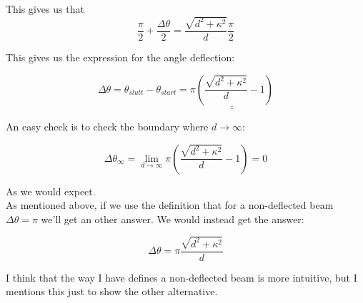 \documentclass[a4paper,norsk, 10pt]{article}
\begin{document}
This gives us that 
$$
\frac{\pi}{2} + \frac{\Delta \theta}{2} = \frac{\sqrt{d^2 +\kappa^2}}{d} \frac{\pi}{2}
$$


This gives us the expression for the angle deflection:

$$
\Delta \theta = \theta_{slutt} - \theta_{start} = \underline{\underline{\pi \left(\frac{\sqrt{d^2 +\kappa^2}}{d} - 1\right)}}
$$

An easy check is to check the boundary where $d \rightarrow \infty$:

$$
\Delta \theta_{\infty} = \lim_{d\rightarrow \infty}  \pi \left(\frac{\sqrt{d^2 +\kappa^2}}{d} - 1\right) = 0
$$

As we would expect.\\

 As mentioned above, if we use the definition that for a non-deflected beam $\Delta \theta = \pi$ we'll get an other answer. We would instead get the answer:

$$
\Delta \theta = \pi\frac{\sqrt{d^2 + \kappa^2}}{d}
$$

I think that the way I have defines a non-deflected beam is more intuitive, but I mentions this just to show the other alternative.
\end{document}
